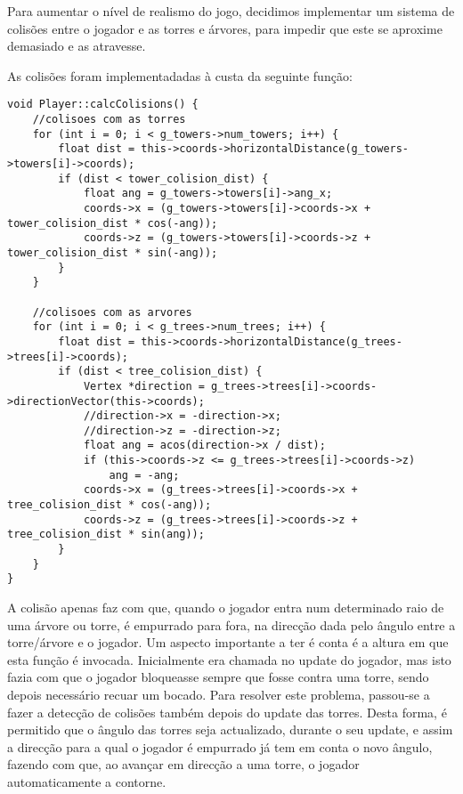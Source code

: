 Para aumentar o nível de realismo do jogo, decidimos implementar um sistema de colisões entre o jogador e as torres e árvores, para impedir que este se aproxime demasiado e as atravesse.

As colisões foram implementadadas à custa da seguinte função:

\begin{lstlisting}[caption=Cálculo de colisões]
void Player::calcColisions() {
	//colisoes com as torres
	for (int i = 0; i < g_towers->num_towers; i++) {
		float dist = this->coords->horizontalDistance(g_towers->towers[i]->coords);
		if (dist < tower_colision_dist) {
			float ang = g_towers->towers[i]->ang_x;
			coords->x = (g_towers->towers[i]->coords->x + tower_colision_dist * cos(-ang));
			coords->z = (g_towers->towers[i]->coords->z + tower_colision_dist * sin(-ang));
		}
	}
	
	//colisoes com as arvores
	for (int i = 0; i < g_trees->num_trees; i++) {
		float dist = this->coords->horizontalDistance(g_trees->trees[i]->coords);
		if (dist < tree_colision_dist) {
			Vertex *direction = g_trees->trees[i]->coords->directionVector(this->coords);
			//direction->x = -direction->x;
			//direction->z = -direction->z;
			float ang = acos(direction->x / dist);
			if (this->coords->z <= g_trees->trees[i]->coords->z)
				ang = -ang;
			coords->x = (g_trees->trees[i]->coords->x + tree_colision_dist * cos(-ang));
			coords->z = (g_trees->trees[i]->coords->z + tree_colision_dist * sin(ang));
		}
	}
}
\end{lstlisting}

A colisão apenas faz com que, quando o jogador entra num determinado raio de uma árvore ou torre, é empurrado para fora, na direcção dada pelo ângulo entre a torre/árvore e o jogador.
Um aspecto importante a ter é conta é a altura em que esta função é invocada.
Inicialmente era chamada no update do jogador, mas isto fazia com que o jogador bloqueasse sempre que fosse contra uma torre, sendo depois necessário recuar um bocado.
Para resolver este problema, passou-se a fazer a detecção de colisões também depois do update das torres. Desta forma, é permitido que o ângulo das torres seja actualizado, durante o seu update, e assim a direcção para a qual o jogador é empurrado já tem em conta o novo ângulo, fazendo com que, ao avançar em direcção a uma torre, o jogador automaticamente a contorne.
